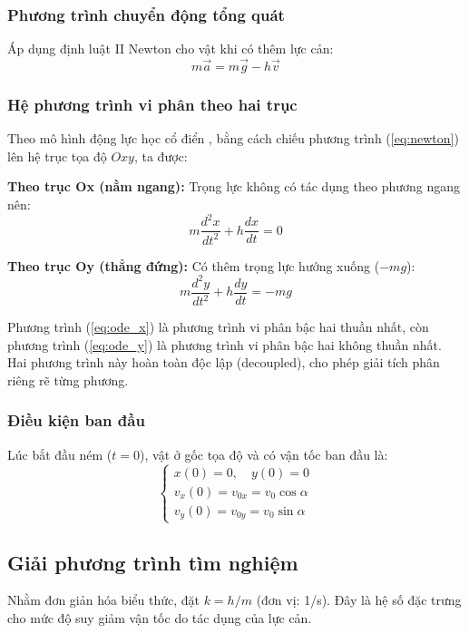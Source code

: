 \subsubsection{Phương trình chuyển động tổng quát}
Áp dụng định luật II Newton cho vật khi có thêm lực cản:
\begin{equation}
m\vec{a} = m\vec{g} - h\vec{v}
\label{eq:newton}
\end{equation}

\subsubsection{Hệ phương trình vi phân theo hai trục}
Theo mô hình động lực học cổ điển \cite{taylor2005classical}, bằng cách chiếu phương trình (\ref{eq:newton}) lên hệ trục tọa độ $Oxy$, ta được:

\textbf{Theo trục Ox (nằm ngang):} Trọng lực không có tác dụng theo phương ngang nên:
\begin{equation}
m\frac{d^2x}{dt^2} + h\frac{dx}{dt} = 0
\label{eq:ode_x}
\end{equation}

\textbf{Theo trục Oy (thẳng đứng):} Có thêm trọng lực hướng xuống ($-mg$):
\begin{equation}
m\frac{d^2y}{dt^2} + h\frac{dy}{dt} = -mg
\label{eq:ode_y}
\end{equation}

Phương trình (\ref{eq:ode_x}) là phương trình vi phân bậc hai thuần nhất, còn phương trình (\ref{eq:ode_y}) là phương trình vi phân bậc hai không thuần nhất. Hai phương trình này hoàn toàn độc lập (decoupled), cho phép giải tích phân riêng rẽ từng phương.

\subsubsection{Điều kiện ban đầu}
Lúc bắt đầu ném ($t = 0$), vật ở gốc tọa độ và có vận tốc ban đầu là:
\begin{equation}
\begin{cases}
x(0) = 0, \quad y(0) = 0 \\[4pt]
v_x(0) = v_{0x} = v_0 \cos\alpha \\[4pt]
v_y(0) = v_{0y} = v_0 \sin\alpha
\end{cases}
\label{eq:ic}
\end{equation}


\subsection{Giải phương trình tìm nghiệm}
Nhằm đơn giản hóa biểu thức, đặt $k = h/m$ (đơn vị: 1/s). Đây là hệ số đặc trưng cho mức độ suy giảm vận tốc do tác dụng của lực cản.

